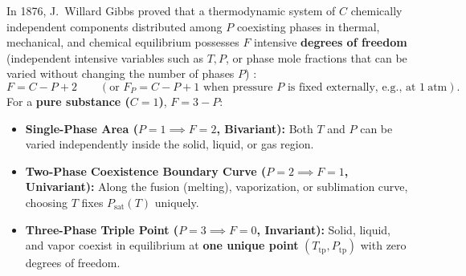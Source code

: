 In 1876, J.~Willard Gibbs proved that a thermodynamic system of $C$ chemically independent components distributed among $P$ coexisting phases in thermal, mechanical, and chemical equilibrium possesses $F$ intensive \textbf{degrees of freedom} (independent intensive variables such as $T, P$, or phase mole fractions that can be varied without changing the number of phases $P$) :
\begin{equation}\label{eq:05:gibbs}
  F = C - P + 2 \qquad (\text{or } F_P = C - P + 1 \text{ when pressure } P \text{ is fixed externally, e.g., at } \SI{1}{\text{atm}}).
\end{equation}
For a \textbf{pure substance ($C = 1$)}, $F = 3 - P$:
\begin{itemize}
  \item \textbf{Single-Phase Area ($P = 1 \implies F = 2$, Bivariant):} Both $T$ and $P$ can be varied independently inside the solid, liquid, or gas region.
  \item \textbf{Two-Phase Coexistence Boundary Curve ($P = 2 \implies F = 1$, Univariant):} Along the fusion (melting), vaporization, or sublimation curve, choosing $T$ fixes $P_{\mathrm{sat}}(T)$ uniquely.
  \item \textbf{Three-Phase Triple Point ($P = 3 \implies F = 0$, Invariant):} Solid, liquid, and vapor coexist in equilibrium at \textbf{one unique point} $(T_{\mathrm{tp}}, P_{\mathrm{tp}})$ with zero degrees of freedom.
\end{itemize}

